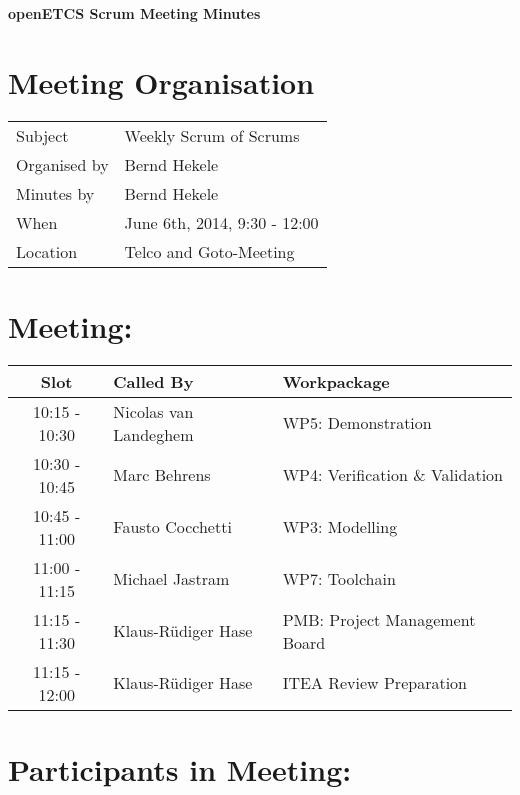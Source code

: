 \documentclass[a4paper, 11pt]{article}
\begin{document}
{\begin{center}\huge\bf openETCS Scrum Meeting Minutes\end{center}}
\section{Meeting Organisation}

\renewcommand{\arraystretch}{1.5}
\begin{supertabular}{m{.2\textwidth}m{.8\textwidth}}
Subject & Weekly Scrum of Scrums\\
Organised by & Bernd Hekele\\
Minutes by & Bernd Hekele\\
When & June 6th, 2014, 9:30 - 12:00\\
Location & Telco and Goto-Meeting\\
\end{supertabular}

\renewcommand{\arraystretch}{1.0}
\section{Meeting:}

\begin{tabular}{|c|l|l|}
\hline
\textbf{Slot} &  \textbf{Called By} & \textbf{Workpackage} \\
\hline  
10:15 - 10:30 & Nicolas van Landeghem & WP5: Demonstration \\\hline  
10:30 - 10:45 & Marc Behrens & WP4: Verification \& Validation \\\hline  
10:45 - 11:00 & Fausto Cocchetti & WP3: Modelling \\\hline  
11:00 - 11:15 & Michael Jastram & WP7: Toolchain \\\hline
11:15 - 11:30 & Klaus-R\"udiger Hase & PMB: Project Management Board \\\hline  
11:15 - 12:00 & Klaus-R\"udiger Hase & ITEA Review Preparation \\\hline  
\end{tabular}

\section{Participants in Meeting:}
\end{document}
